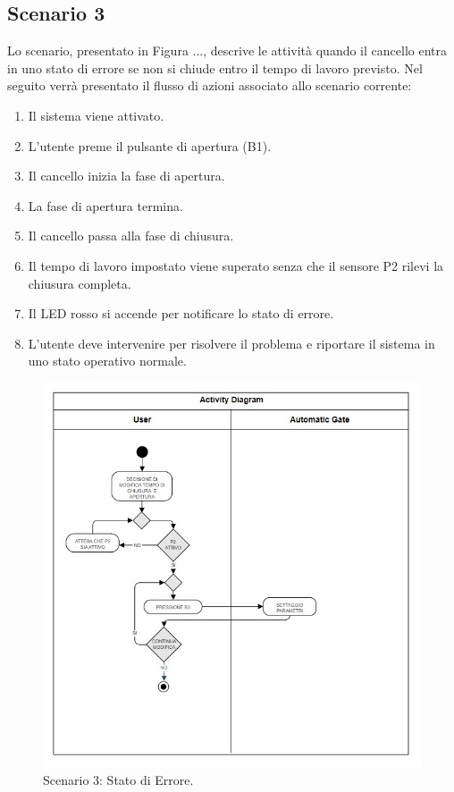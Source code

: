 \documentclass[12pt]{article}
\begin{document}
\subsection{Scenario 3}
Lo scenario, presentato in Figura ..., descrive le attività quando il cancello entra in uno stato di errore se non si chiude entro il tempo di lavoro previsto. Nel seguito verrà presentato il flusso di azioni associato allo scenario corrente:

\begin{enumerate}
    \item Il sistema viene attivato.
    \item L'utente preme il pulsante di apertura (B1).
    \item Il cancello inizia la fase di apertura.
    \item La fase di apertura termina.
    \item Il cancello passa alla fase di chiusura.
    \item Il tempo di lavoro impostato viene superato senza che il sensore P2 rilevi la chiusura completa.
    \item Il LED rosso si accende per notificare lo stato di errore.
    \item L’utente deve intervenire per risolvere il problema e riportare il sistema in uno stato operativo normale.
\end{enumerate}

\begin{figure}[h]
    \centering
    \includegraphics[width = 0.7 \textwidth]{Scenario_3.jpg}
    \caption{Scenario 3: Stato di Errore.}
    
\end{figure}
\end{document}
